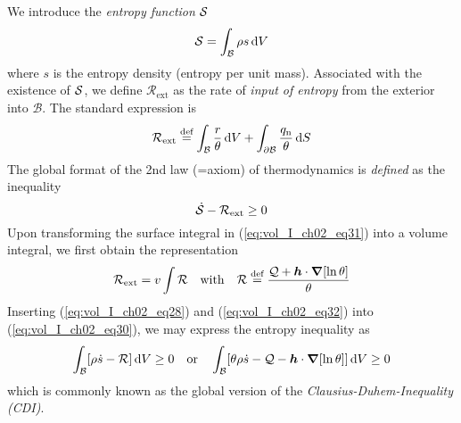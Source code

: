 We introduce the {\em entropy function}
${\mathcal S}$
\begin{equation}
  {\mathcal S} = \int_{\mathcal{B}} \rho s \mathop{}\!\mathrm{d} V
     \label{eq:vol_I_ch02_eq28}
\end{equation}
where $s$ is the entropy density (entropy per unit mass). Associated with 
the existence of ${\mathcal S}$, we define ${\mathcal
R}_{\mathrm{ext}}$ as the rate of {\em input of entropy} from the
exterior into $\mathcal B$. The standard expression is
\begin{equation}
  \mathcal{R}_\mathrm{ext} \stackrel{\text{def}}{=}
  \int_{\mathcal{B}}  \frac{r}{\theta}  \mathop{}\!\mathrm{d} V +
  \int_{\partial \mathcal{B}}  \frac{q_{\mathrm{n}}}{\theta}  \mathop{}\!\mathrm{d} S
     \label{eq:vol_I_ch02_eq31}
\end{equation}
The global format of the 2nd law (=axiom) of thermodynamics
 is {\em defined} as the inequality
\begin{equation}
  \dot{{\mathcal S}} - \mathcal{R}_\mathrm{ext} \geq 0
     \label{eq:vol_I_ch02_eq30}
\end{equation}
Upon transforming the surface integral in (\ref{eq:vol_I_ch02_eq31})
into a  volume integral, we first obtain the representation
\begin{equation}
    \mathcal{R}_\mathrm{ext} = v\int{ \mathcal{R} } \quad \mathrm{with} \quad
  {\mathcal R} \stackrel{\text{def}}{=}
  \frac{\mathcal{Q} + \bm{h} \cdot {\bm\nabla} [\ln\theta]}{\theta}
 \label{eq:vol_I_ch02_eq32}
\end{equation}
Inserting (\ref{eq:vol_I_ch02_eq28}) and (\ref{eq:vol_I_ch02_eq32})
into (\ref{eq:vol_I_ch02_eq30}), we may express the entropy inequality as
\begin{equation}
 \label{eq:vol_I_ch02_eq33}
  \int_{\mathcal{B}}  [\rho \dot{s} - \mathcal{R}]  \mathop{}\!\mathrm{d} V \geq 0 \quad \mbox{or} \quad
  \int_{\mathcal{B}}  [\theta\rho \dot{s} - \mathcal{Q} - \bm{h} \cdot {\bm\nabla}[\ln\theta]]  \mathop{}\!\mathrm{d} V \geq 0
\end{equation}
which is commonly known as the global version of 
the {\em Clausius-Duhem-Inequality (CDI)}.

